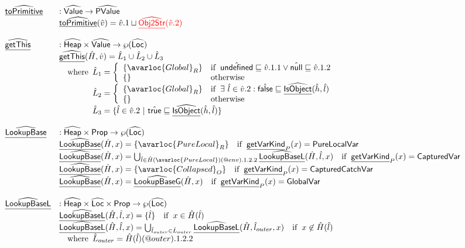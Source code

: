 \[\begin{array}{ll}
\ahf{toPrimitive} & : \aValue \rightarrow \abs{PValue} \\
& \ahf{toPrimitive}(\hat{v})
  = \hat{v}.1 \sqcup \inred \ahf{Obj2Str}(\hat{v}.2) \\
\\
\ahf{getThis} & : \aHeap \times \aValue \rightarrow \powerset{\aLoc} \\
& \ahf{getThis}(\hat{H}, \hat{v})
  = \hat{L}_1\cup\hat{L}_2\cup\hat{L}_3\\
& \quad\wherec{
  \hat{L}_1 = \left\{
    \begin{array}{ll}
      \{\avarloc{Global}_R\} & \ifc{\aundef\sqsubseteq\hat{v}.1.1 \vee \anull\sqsubseteq\hat{v}.1.2} \\
      \{\} & \owc \\
    \end{array}
    \right.\\
  \hat{L}_2 = \left\{
    \begin{array}{ll}
      \{\avarloc{Global}_R\} & \ifc{\exists\ \hat{l} \in \hat{v}.2 : \afalse \sqsubseteq \ahf{IsObject}(\hat{h},\hat{l})} \\
      \{\} & \owc \\
    \end{array}
    \right.\\
  \hat{L}_3 = \{ \hat{l} \in \hat{v}.2 ~|~ \atrue \sqsubseteq \ahf{IsObject}(\hat{h},\hat{l}) \} \\
}

\\
\\
\ahf{LookupBase} & : \aHeap \times \SF{Prop} \rightarrow \powerset{\aLoc}\\
& \ahf{LookupBase}(\hat{H},x) = \{ \avarloc{PureLocal}_R \} 
    \quad\ifc{\chf{getVarKind}_P(x) = \SF{PureLocalVar}} \\
& \ahf{LookupBase}(\hat{H},x) = \bigcup_{\hat{l}\in\hat{H}(\avarloc{PureLocal})(\varprop{env}).1.2.2} \ahf{LookupBaseL}(\hat{H},\hat{l},x)
    \quad\ifc{\chf{getVarKind}_P(x) = \SF{CapturedVar}} \\
& \ahf{LookupBase}(\hat{H},x) = \{ \avarloc{Collapsed}_O \} 
    \quad\ifc{\chf{getVarKind}_P(x) = \SF{CapturedCatchVar}} \\
& \ahf{LookupBase}(\hat{H},x) = \ahf{LookupBaseG}(\hat{H},x)
    \quad\ifc{\chf{getVarKind}_P(x) = \SF{GlobalVar}} \\
\\

\ahf{LookupBaseL} & : \aHeap \times \aLoc \times \SF{Prop} \rightarrow \powerset{\aLoc} \\
& \ahf{LookupBaseL}(\hat{H}, \hat{l}, x) = \{\hat{l}\} \quad\ifc{x \in \hat{H}(\hat{l})}\\
& \ahf{LookupBaseL}(\hat{H}, \hat{l}, x) = \bigcup_{\hat{l}_{outer}\in\hat{L}_{outer}}\ahf{LookupBaseL}(\hat{H}, \hat{l}_{outer}, x)
    \quad\ifc{x \not\in \hat{H}(\hat{l})} \\
&   \quad\wherec{\hat{L}_{outer} = \hat{H}(\hat{l})(\varprop{outer}).1.2.2} \\
\\


\end{array}\]
